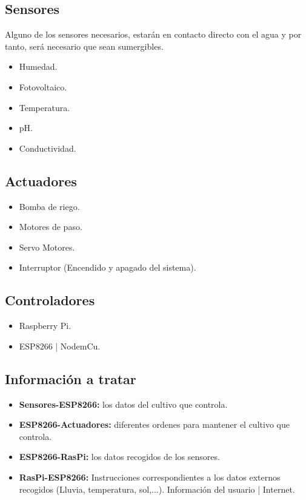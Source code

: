 \documentclass[12pt,a4paper,titlepage,oneside]{report}
\begin{document}
	\subsection*{Sensores}
	Alguno de los sensores necesarios, estarán en contacto directo con el agua y por tanto, será necesario que sean sumergibles.\cite{sensores}
		\begin{itemize}
			\item Humedad.
			\item Fotovoltaico.
			\item Temperatura.
			\item pH.
			\item Conductividad.
		\end{itemize}

	\subsection*{Actuadores}

		\begin{itemize}
			\item Bomba de riego.
			\item Motores de paso.
			\item Servo Motores.
			\item Interruptor (Encendido y apagado del sistema).
		\end{itemize}			
	
	\subsection*{Controladores}
		
		\begin{itemize}
			\item Raspberry Pi.
			\item ESP8266 | NodemCu.
		\end{itemize}			
	
	\subsection*{Información a tratar}
		
		\begin{itemize}
			\item \textbf{Sensores-ESP8266:} los datos del cultivo que controla.
			\item \textbf{ESP8266-Actuadores:} diferentes ordenes para mantener el cultivo que controla.
			\item \textbf{ESP8266-RasPi:} los datos recogidos de los sensores.
			\item \textbf{RasPi-ESP8266:} Instrucciones correspondientes a los datos externos recogidos (Lluvia, temperatura, sol,...). Información del usuario | Internet.
			
		\end{itemize}
\end{document}
